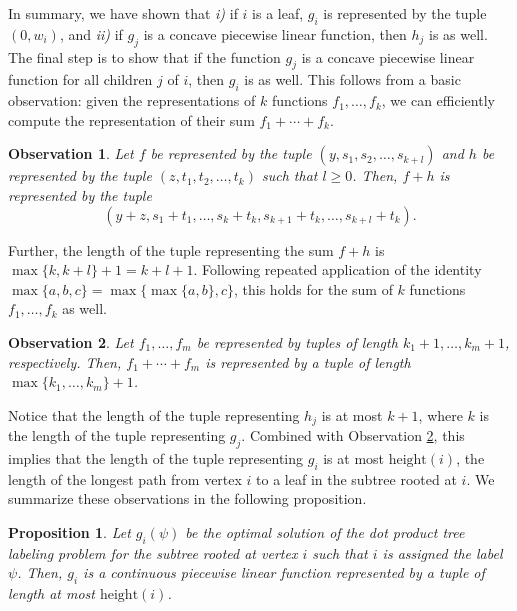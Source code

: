 \documentclass[10pt]{article}
\newtheorem{proposition}{Proposition}
\newtheorem{observation}{Observation}
\begin{document}
In summary, we have shown that \textit{i)} if $i$ is a leaf, $g_i$ is represented by the tuple $(0, w_i)$,
and \textit{ii)} if $g_j$ is a concave piecewise linear function, then $h_j$ is as well. The final 
step is to show that if the function $g_j$ is a concave piecewise linear function for all children $j$ of $i$,
then $g_i$ is as well. 
This follows from a basic observation: given the representations of $k$ functions $f_1, \ldots, f_k$, we
can efficiently compute the representation of their sum $f_1 + \cdots + f_k$.
\begin{observation}
    \label{obs:g_sum}
    Let $f$ be represented by the tuple $(y, s_1, s_2, \ldots, s_{k + l})$ and
    $h$ be represented by the tuple $(z, t_1, t_2, \ldots, t_{k})$ such that $l \geq 0$. 
    Then, $f + h$ is represented by the tuple
    \[(y + z, s_1 + t_1, \ldots, s_{k} + t_{k}, s_{k + 1} + t_{k}, \ldots, s_{k + l} + t_{k}).\]
\end{observation}
\vspace{-0.5em}
Further, the length of the tuple representing the sum $f + h$ is $\max\{k, k + l\} + 1 = k + l + 1$.
Following repeated application of the identity $\max\{a, b, c\} = \max\{\max\{a, b\}, c\}$,
this holds for the sum of $k$ functions $f_1, \ldots, f_k$ as well.
\begin{observation}
    \label{obs:g_sum_length}
    Let $f_1, \ldots, f_m$ be represented by tuples of length $k_1 + 1, \ldots, k_m + 1$, respectively. 
    Then, $f_1 + \cdots + f_m$ is represented by a tuple of length 
    $\max\{k_1, \ldots, k_m\} + 1$.
\end{observation}

Notice that the length of the tuple representing $h_j$ is at most $k + 1$, where $k$ is the length of the tuple representing $g_j$. 
Combined with Observation \ref{obs:g_sum_length}, this implies that the length of the tuple representing $g_i$ is at most $\text{height}(i)$,
the length of the longest path from vertex $i$ to a leaf in the subtree rooted at $i$. We summarize these
observations in the following proposition.
\begin{proposition}
    \label{prop:g_pieces}
    Let $g_i(\psi)$ be the optimal solution of the dot product tree labeling problem for the subtree rooted at 
    vertex $i$ such that $i$ is assigned the label $\psi$.
    Then, $g_i$ is a continuous piecewise linear function represented by a tuple of length at most $\text{height}(i)$.
\end{proposition}
\end{document}
